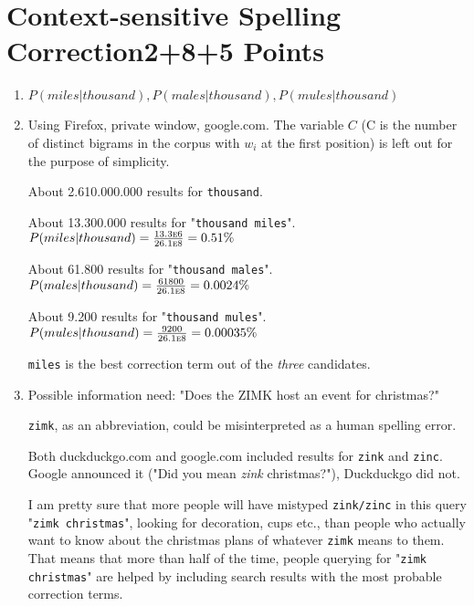 \documentclass[10pt,a4paper]{article}
\begin{document}
\newpage
\section{\hfill Context-sensitive Spelling Correction\hfill 2+8+5 Points}
\begin{enumerate}
    \item $ P(miles|thousand), P(males|thousand), P(mules|thousand) $
    \item Using Firefox, private window, google.com. The variable $C$ (C is the number of distinct bigrams in the corpus with $w_i$ at the first position) is left out for the purpose of simplicity.
    
        About 2.610.000.000 results for \texttt{thousand}.
        
        About 13.300.000 results for "\texttt{thousand miles}". $P(miles|thousand)=\frac{13.3\textsc{e}6}{26.1\textsc{e}8}=0.51\%$
        
        About 61.800 results for "\texttt{thousand males}". $P(males|thousand)=\frac{61800}{26.1\textsc{e}8}=0.0024\%$
        
        About 9.200 results for "\texttt{thousand mules}". $P(mules|thousand)=\frac{9200}{26.1\textsc{e}8}=0.00035\%$
        
        \texttt{miles} is the best correction term out of the \textit{three} candidates.
    \item Possible information need: "Does the ZIMK host an event for christmas?"
    
        \texttt{zimk}, as an abbreviation, could be misinterpreted as a human spelling error.
        
        Both duckduckgo.com and google.com included results for \texttt{zink} and \texttt{zinc}. Google announced it ("Did you mean \textit{zink} christmas?"), Duckduckgo did not.
        
        I am pretty sure that more people will have mistyped \texttt{zink/zinc} in this query "\texttt{zimk christmas}", looking for decoration, cups etc., than people who actually want to know about the christmas plans of whatever \texttt{zimk} means to them. That means that more than half of the time, people querying for "\texttt{zimk christmas}" are helped by including search results with the most probable correction terms.
\end{enumerate}
\end{document}
